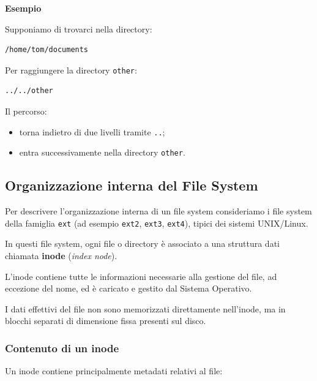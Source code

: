 \bigskip

\noindent
\textbf{Esempio}

Supponiamo di trovarci nella directory:

\begin{verbatim}
/home/tom/documents
\end{verbatim}

\noindent
Per raggiungere la directory \texttt{other}:

\begin{verbatim}
../../other
\end{verbatim}

\noindent
Il percorso:
\begin{itemize}
    \item torna indietro di due livelli tramite \texttt{..};
    
    \item entra successivamente nella directory \texttt{other}.
\end{itemize}
\subsection{Organizzazione interna del File System}
Per descrivere l’organizzazione interna di un file system consideriamo i file system della famiglia \texttt{ext} (ad esempio \texttt{ext2}, \texttt{ext3}, \texttt{ext4}), tipici dei sistemi UNIX/Linux.
\medskip

\noindent In questi file system, ogni file o directory è associato a una struttura dati chiamata \textbf{inode} (\textit{index node}).

\noindent L’inode contiene tutte le informazioni necessarie alla gestione del file, ad eccezione del nome, ed è caricato e gestito dal Sistema Operativo.

\medskip

\noindent I dati effettivi del file non sono memorizzati direttamente nell’inode, ma in blocchi separati di dimensione fissa presenti sul disco.

\bigskip

\subsubsection*{Contenuto di un inode}
Un inode contiene principalmente metadati relativi al file:

